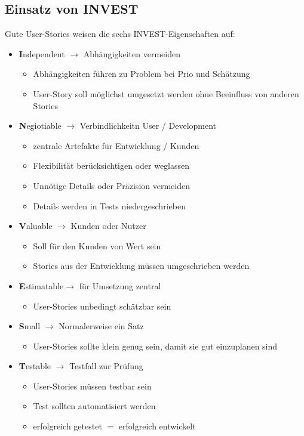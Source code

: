 \documentclass{report}
\theoremstyle{definition}
\theoremstyle{example}
\begin{document}
\subsection{Einsatz von INVEST}
Gute User-Stories weisen die sechs INVEST-Eigenschaften auf:
\begin{itemize}
	\item {\textbf{I}ndependent $\rightarrow$ Abhängigkeiten vermeiden
	\begin{itemize}
		\item Abhängigkeiten führen zu Problem bei Prio und Schätzung
		\item User-Story soll möglichst umgesetzt werden ohne Beeinfluss von anderen Stories
	\end{itemize}
	}
	\item {\textbf{N}egiotiable $\rightarrow$ Verbindlichkeitn User / Development
	\begin{itemize}
		\item zentrale Artefakte für Entwicklung / Kunden
		\item Flexibilität berücksichtigen oder weglassen
		\item Unnötige Details oder Präzision vermeiden
		\item Details werden in Tests niedergeschrieben
	\end{itemize}
	}
	\item {\textbf{V}aluable $\rightarrow$ Kunden oder Nutzer
	\begin{itemize}
		\item Soll für den Kunden von Wert sein
		\item Stories aus der Entwicklung müssen umgeschrieben werden
	\end{itemize}
	}
	\item {\textbf{E}stimatable$\rightarrow$ für Umsetzung zentral
	\begin{itemize}
		\item User-Stories unbedingt schätzbar sein
	\end{itemize}
	}
	\item {\textbf{S}mall $\rightarrow$ Normalerweise ein Satz
	\begin{itemize}
		\item User-Stories sollte klein genug sein, damit sie gut einzuplanen sind
	\end{itemize}
	}
	\item {\textbf{T}estable $\rightarrow$ Testfall zur Prüfung
	\begin{itemize}
		\item User-Stories müssen testbar sein
		\item Test sollten automatisiert werden
		\item erfolgreich getestet $=$ erfolgreich entwickelt
	\end{itemize}
	}
\end{itemize}
\end{document}

